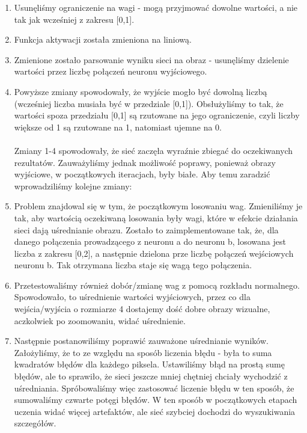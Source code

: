 \documentclass[12pt,a4paper,oneside]{article}
\begin{document}
\begin{enumerate}
\item Usunęliśmy ograniczenie na wagi - mogą przyjmować dowolne wartości, a nie tak jak wcześniej z zakresu [0,1]. 
\item Funkcja aktywacji została zmieniona na liniową. 
\item Zmienione zostało parsowanie wyniku sieci na obraz - usunęliśmy dzielenie wartości przez liczbę połączeń neuronu wyjściowego.
\item Powyższe zmiany spowodowały, że wyjście mogło być dowolną liczbą (wcześniej liczba musiała być w przedziale [0,1]). Obsłużyliśmy to tak, że wartości spoza przedziału [0,1] są rzutowane na jego ograniczenie, czyli liczby większe od 1 są rzutowane na 1, natomiast ujemne na 0.
\\ \\
Zmiany 1-4 spowodowały, że sieć zaczęła wyraźnie zbiegać do oczekiwanych rezultatów. Zauważyliśmy jednak możliwość poprawy, ponieważ obrazy wyjściowe, w początkowych iteracjach, były białe. Aby temu zaradzić wprowadziliśmy kolejne zmiany:
\\
\item Problem znajdowal się w tym, że początkowym losowaniu wag. Zmieniliśmy je tak, aby wartością oczekiwaną losowania były wagi, które w efekcie działania sieci dają uśrednianie obrazu. Zostało to zaimplementowane tak, że, dla danego połączenia prowadzącego z neuronu a do neuronu b, losowana jest liczba z zakresu [0,2], a następnie dzielona prze liczbę połączeń wejściowych neuronu b. Tak otrzymana liczba staje się wagą tego połączenia.

\item Przetestowaliśmy również dobór/zmianę wag z pomocą rozkładu normalnego. Spowodowało, to uśrednienie wartości wyjściowych, przez co dla wejścia/wyjścia o rozmiarze 4 dostajemy dość dobre obrazy wizualne, aczkolwiek po zoomowaniu, widać uśrednienie.

\item Następnie postanowiliśmy poprawić zauważone uśrednianie wyników. Założyliśmy, że to ze względu na sposób liczenia błędu - była to suma kwadratów błędów dla każdego piksela. Ustawiliśmy błąd na prostą sumę błędów, ale to sprawiło, że sieci jeszcze mniej chętniej chciały wychodzić z uśredniania. Spróbowaliśmy więc zastosować liczenie błędu w ten sposób, że sumowaliśmy czwarte potęgi błędów. W ten sposób w początkowych etapach uczenia widać więcej artefaktów, ale sieć szybciej dochodzi do wyszukiwania szczegółów.
\end{enumerate}
\end{document}
